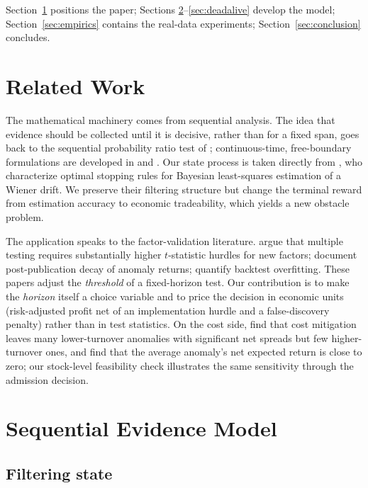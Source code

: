 \documentclass[11pt]{article}
\begin{document}
Section~\ref{sec:related} positions the paper; Sections
\ref{sec:model}--\ref{sec:deadalive} develop the model;
Section~\ref{sec:empirics} contains the real-data experiments;
Section~\ref{sec:conclusion} concludes.

\section{Related Work}
\label{sec:related}

The mathematical machinery comes from sequential analysis.  The idea that evidence
should be collected until it is decisive, rather than for a fixed span, goes back to
the sequential probability ratio test of \citet{wald1945}; continuous-time,
free-boundary formulations are developed in \citet{shiryaev2008} and
\citet{peskirShiryaev2006}.  Our state process is taken directly from
\citet{ekstromKaratzasVaicenavicius2022}, who characterize optimal stopping rules for
Bayesian least-squares estimation of a Wiener drift.  We preserve their filtering
structure but change the terminal reward from estimation accuracy to economic
tradeability, which yields a new obstacle problem.

The application speaks to the factor-validation literature.
\citet{harveyLiuZhu2016} argue that multiple testing requires substantially higher
$t$-statistic hurdles for new factors; \citet{mcleanPontiff2016} document
post-publication decay of anomaly returns; \citet{baileyBorweinLopezdePradoZhu2017}
quantify backtest overfitting.  These papers adjust the \emph{threshold} of a
fixed-horizon test.  Our contribution is to make the \emph{horizon} itself a choice
variable and to price the decision in economic units (risk-adjusted profit net of
an implementation hurdle and a false-discovery penalty) rather than in test statistics.
On the cost side, \citet{novyMarxVelikov2016} find that cost mitigation leaves many
lower-turnover anomalies with significant net spreads but few higher-turnover ones,
and \citet{chenVelikov2023} find that the average anomaly's net expected return is
close to zero; our stock-level feasibility check illustrates the same sensitivity
through the admission decision.

\section{Sequential Evidence Model}
\label{sec:model}

\subsection{Filtering state}
\end{document}
